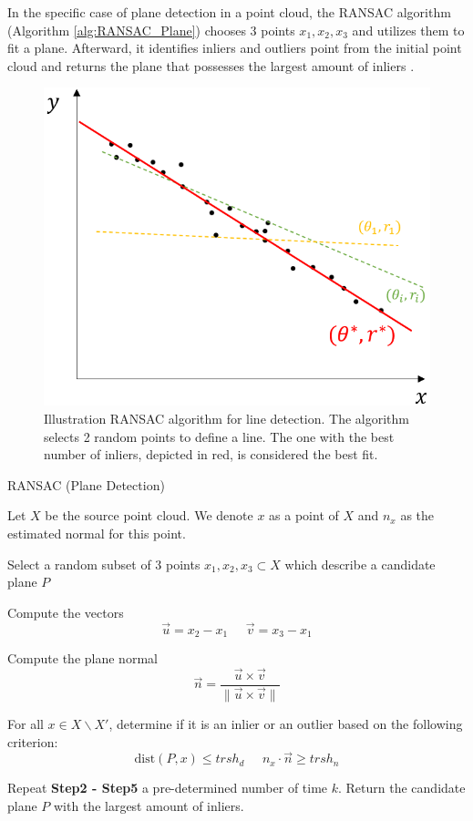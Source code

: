 In the specific case of plane detection in a point cloud, the RANSAC algorithm (Algorithm \ref{alg:RANSAC_Plane}) chooses 3 points $x_1,x_2,x_3$ and utilizes them to fit a plane. Afterward, it identifies inliers and outliers point from the initial point cloud and returns the plane that possesses the largest amount of inliers \cite{ransac_planedetection}.
\begin{figure}[ht]
    \centering
    \includegraphics[scale=0.8]{Img/03_RANSAC2.png}
    \caption{Illustration RANSAC algorithm for line detection. The algorithm selects 2 random points to define a line. The one with the best number of inliers, depicted in red, is considered the best fit.}
    \label{fig:ransac_illustration}
\end{figure}

\begin{algorithm}[ht]
\caption{RANSAC (Plane Detection)}\label{alg:RANSAC_Plane}
\begin{description}[leftmargin=!, labelwidth=\widthof{\textbf{Step1: }}]
    \item [Step 1:] Let $X$ be the source point cloud. We denote $x$ as a point of $X$ and $n_x$ as the estimated normal for this point.
    \item [Step 2:] Select a random subset of 3 points $ x_1,x_2,x_3\subset X$ which describe a candidate plane $P$
    \item [Step 3:] Compute the vectors 
        \[\vec{u} = x_2 - x_1 \; \; \; \; \; \vec{v} = x_3 - x_1\]
    \item [Step 4:] Compute the plane normal 
        \[\vec{n} = \frac{\vec{u} \times \vec{v} }{\| \vec{u} \times \vec{v}\| }\]
    \item [Step 5:] For all $x \in X \backslash X'$, determine if it is an inlier or an outlier based on the following criterion:
    \[ \text{dist}(P,x) \leq trsh_d \; \; \; \; \; n_x \cdot \vec{n} \geq trsh_n\]
    \item [Step 6:] Repeat \textbf{Step2 - Step5} a pre-determined number of time $k$. Return the candidate plane $P$ with the largest amount of inliers.
\end{description}
\end{algorithm}

